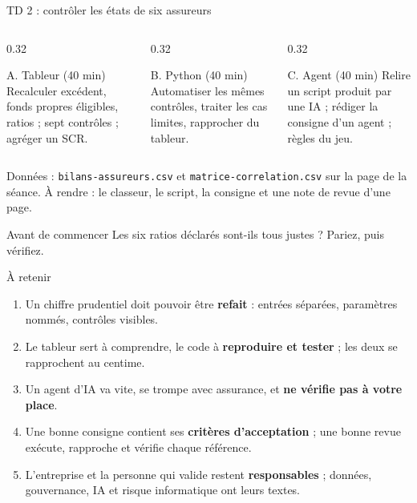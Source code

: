 \documentclass[10pt,aspectratio=169]{beamer}
\newcommand{\fx}[1]{\texttt{\small #1}}
\begin{document}
\begin{frame}{TD 2 : contrôler les états de six assureurs}
\begin{columns}[T]
\begin{column}{0.32\textwidth}
\begin{block}{A. Tableur (40 min)}
\small
Recalculer excédent, fonds propres éligibles, ratios ; sept contrôles ; agréger un SCR.
\end{block}
\end{column}
\begin{column}{0.32\textwidth}
\begin{block}{B. Python (40 min)}
\small
Automatiser les mêmes contrôles, traiter les cas limites, rapprocher du tableur.
\end{block}
\end{column}
\begin{column}{0.32\textwidth}
\begin{block}{C. Agent (40 min)}
\small
Relire un script produit par une IA ; rédiger la consigne d'un agent ; règles du jeu.
\end{block}
\end{column}
\end{columns}
\vspace{0.4cm}
\small Données : \fx{bilans-assureurs.csv} et \fx{matrice-correlation.csv} sur la page de la séance.
À rendre : le classeur, le script, la consigne et une note de revue d'une page.
\begin{alertblock}{Avant de commencer}
Les six ratios déclarés sont-ils tous justes ? Pariez, puis vérifiez.
\end{alertblock}
\end{frame}

\begin{frame}{À retenir}
\begin{enumerate}
  \item Un chiffre prudentiel doit pouvoir être \textbf{refait} : entrées séparées, paramètres nommés, contrôles visibles.
  \item Le tableur sert à comprendre, le code à \textbf{reproduire et tester} ; les deux se rapprochent au centime.
  \item Un agent d'IA va vite, se trompe avec assurance, et \textbf{ne vérifie pas à votre place}.
  \item Une bonne consigne contient ses \textbf{critères d'acceptation} ; une bonne revue exécute, rapproche et vérifie chaque référence.
  \item L'entreprise et la personne qui valide restent \textbf{responsables} ; données, gouvernance, IA et risque informatique ont leurs textes.
\end{enumerate}
\end{frame}
\end{document}
